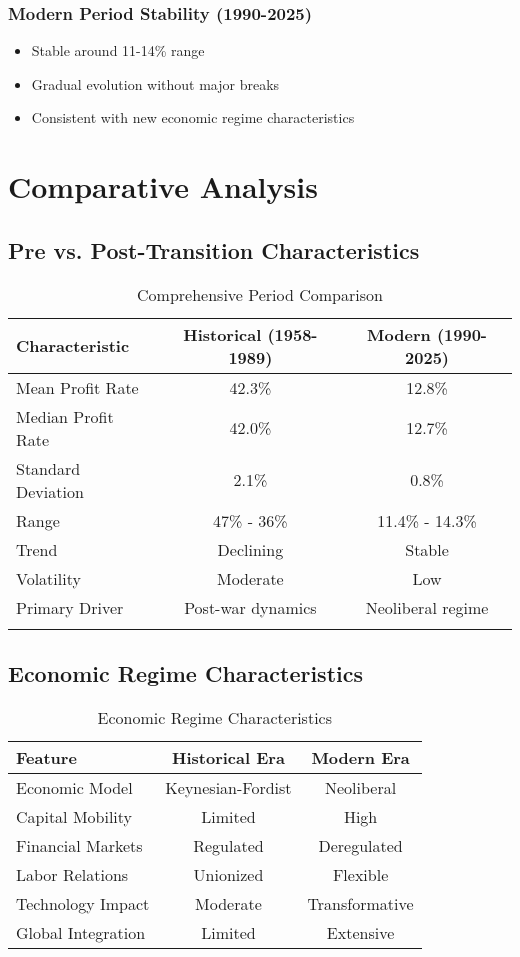 \documentclass[12pt]{article}
\begin{document}
\subsubsection{Modern Period Stability (1990-2025)}
\begin{itemize}
    \item Stable around 11-14\% range
    \item Gradual evolution without major breaks
    \item Consistent with new economic regime characteristics
\end{itemize}

\section{Comparative Analysis}

\subsection{Pre vs. Post-Transition Characteristics}

\begin{longtable}{lcc}
\toprule
\textbf{Characteristic} & \textbf{Historical (1958-1989)} & \textbf{Modern (1990-2025)} \\
\midrule
\endhead
Mean Profit Rate & 42.3\% & 12.8\% \\
Median Profit Rate & 42.0\% & 12.7\% \\
Standard Deviation & 2.1\% & 0.8\% \\
Range & 47\% - 36\% & 11.4\% - 14.3\% \\
Trend & Declining & Stable \\
Volatility & Moderate & Low \\
Primary Driver & Post-war dynamics & Neoliberal regime \\
\bottomrule
\caption{Comprehensive Period Comparison}
\label{tab:comparison}
\end{longtable}

\subsection{Economic Regime Characteristics}

\begin{table}[h]
\centering
\begin{tabular}{lcc}
\toprule
\textbf{Feature} & \textbf{Historical Era} & \textbf{Modern Era} \\
\midrule
Economic Model & Keynesian-Fordist & Neoliberal \\
Capital Mobility & Limited & High \\
Financial Markets & Regulated & Deregulated \\
Labor Relations & Unionized & Flexible \\
Technology Impact & Moderate & Transformative \\
Global Integration & Limited & Extensive \\
\bottomrule
\end{tabular}
\caption{Economic Regime Characteristics}
\label{tab:regimes}
\end{table}
\end{document}
